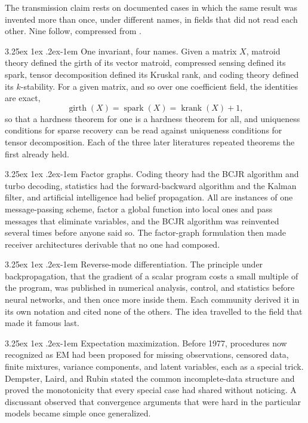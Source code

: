 \documentclass[11pt]{article}
\makeatletter
\renewcommand\paragraph{\@startsection{paragraph}{4}{\z@}%
  {3.25ex \@plus1ex \@minus.2ex}{-1em}%
  {\normalfont\normalsize\itshape}}
\theoremstyle{definition}
\theoremstyle{remark}
\makeatother
\begin{document}
The transmission claim rests on documented cases in which the same result was invented more than once, under different names, in fields that did not read each other. Nine follow, compressed from \citet{cotton2026protocol}.

\paragraph{One invariant, four names.} Given a matrix $X$, matroid theory defined the girth of its vector matroid, compressed sensing defined its spark, tensor decomposition defined its Kruskal rank, and coding theory defined its $k$-stability. For a given matrix, and so over one coefficient field, the identities are exact,
\begin{equation}
\operatorname{girth}(X) = \operatorname{spark}(X) = \operatorname{krank}(X) + 1,
\end{equation}
so that a hardness theorem for one is a hardness theorem for all, and uniqueness conditions for sparse recovery can be read against uniqueness conditions for tensor decomposition. Each of the three later literatures repeated theorems the first already held.

\paragraph{Factor graphs.} Coding theory had the BCJR algorithm and turbo decoding, statistics had the forward-backward algorithm and the Kalman filter, and artificial intelligence had belief propagation. All are instances of one message-passing scheme, factor a global function into local ones and pass messages that eliminate variables, and the BCJR algorithm was reinvented several times before anyone said so. The factor-graph formulation then made receiver architectures derivable that no one had composed.

\paragraph{Reverse-mode differentiation.} The principle under backpropagation, that the gradient of a scalar program costs a small multiple of the program, was published in numerical analysis, control, and statistics before neural networks, and then once more inside them. Each community derived it in its own notation and cited none of the others. The idea travelled to the field that made it famous last.

\paragraph{Expectation maximization.} Before 1977, procedures now recognized as EM had been proposed for missing observations, censored data, finite mixtures, variance components, and latent variables, each as a special trick. Dempster, Laird, and Rubin stated the common incomplete-data structure and proved the monotonicity that every special case had shared without noticing. A discussant observed that convergence arguments that were hard in the particular models became simple once generalized.
\end{document}
